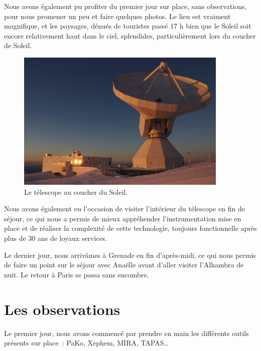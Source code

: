 \documentclass[a4paper,10pt,french]{article}
\begin{document}
Nous avons également pu profiter du premier jour sur place, sans observations,
pour nous promener un peu et faire quelques photos. Le lieu est vraiment
magnifique, et les paysages, dénués de touristes passé 17 h bien que le Soleil
soit encore relativement haut dans le ciel, splendides, particulièrement lors
du coucher de Soleil.

\begin{figure}[ht]
    \centering
    \includegraphics[width=0.9\textwidth]{30m.jpg}
    \caption{Le télescope au coucher du Soleil.}
\end{figure}

Nous avons également eu l’occasion de visiter l’intérieur du télescope en fin
de séjour, ce qui nous a permis de mieux appréhender l’instrumentation mise en
place et de réaliser la complexité de cette technologie, toujours fonctionnelle
après plus de 30 ans de loyaux services.

Le dernier jour, nous arrivâmes à Grenade en fin d’après-midi, ce qui nous
permis de faire un point sur le séjour avec Anaëlle avant d’aller visiter
l’Alhambra de nuit. Le retour à Paris se passa sans encombre.

\section{Les observations}

Le premier jour, nous avons commencé par prendre en main les différents outils
présents sur place : PaKo, Xephem, MIRA, TAPAS…
\end{document}
